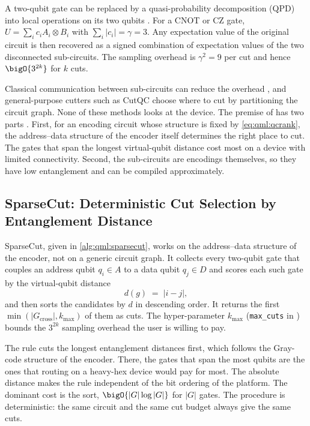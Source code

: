 A two-qubit gate can be replaced by a quasi-probability decomposition (QPD) into local operations on its two qubits \cite{mitarai2021virtualgate,peng2020circuitcutting,bravyi2016trading}. For a CNOT or CZ gate, $U = \sum_i c_i A_i \otimes B_i$ with $\sum_i |c_i| = \gamma = 3$. Any expectation value of the original circuit is then recovered as a signed combination of expectation values of the two disconnected sub-circuits. The sampling overhead is $\gamma^2 = 9$ per cut and hence $\bigO{3^{2k}}$ for $k$ cuts.

Classical communication between sub-circuits can reduce the overhead \cite{piveteau2024knitting}, and general-purpose cutters such as CutQC \cite{tang2021cutqc} choose where to cut by partitioning the circuit graph. None of these methods looks at the device. The premise of \shardq{} has two parts \cite{guo2025shardq}. First, for an encoding circuit whose structure is fixed by \cref{eq:qml:qcrank}, the address--data structure of the encoder itself determines the right place to cut. The gates that span the longest virtual-qubit distance cost most on a device with limited connectivity. Second, the sub-circuits are encodings themselves, so they have low entanglement and can be compiled approximately.

\subsection{SparseCut: Deterministic Cut Selection by Entanglement Distance}\label{sec:qml:shardq:sparsecut}

SparseCut, given in \cref{alg:qml:sparsecut}, works on the address--data structure of the encoder, not on a generic circuit graph. It collects every two-qubit gate that couples an address qubit $q_i\in A$ to a data qubit $q_j\in D$ and scores each such gate by the virtual-qubit distance
\begin{equation}\label{eq:qml:sparsecut-score}
d(g) \;=\; \lvert i - j\rvert,
\end{equation}
and then sorts the candidates by $d$ in descending order. It returns the first $\min(\lvert G_{\mathrm{cross}}\rvert, k_{\max})$ of them as cuts. The hyper-parameter $k_{\max}$ (\texttt{max\_cuts} in \cite{guo2025shardq}) bounds the $3^{2k}$ sampling overhead the user is willing to pay.

The rule cuts the longest entanglement distances first, which follows the Gray-code structure of the encoder. There, the gates that span the most qubits are the ones that routing on a heavy-hex device would pay for most. The absolute distance makes the rule independent of the bit ordering of the platform. The dominant cost is the sort, $\bigO{|G| \log |G|}$ for $|G|$ gates. The procedure is deterministic: the same circuit and the same cut budget always give the same cuts.


